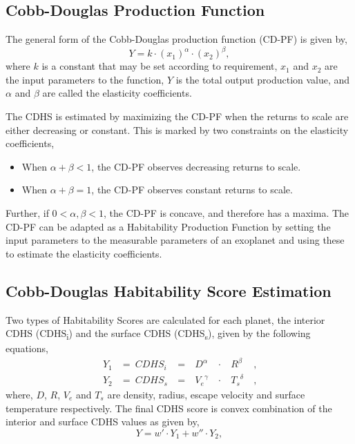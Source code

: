 \documentclass{article}
\begin{document}
\subsection{Cobb-Douglas Production Function}
The general form of the Cobb-Douglas production function (CD-PF) is given by,
\begin{equation}
  Y = k\cdot{(x_1)}^\alpha\cdot{(x_2)}^\beta,
\end{equation}
where $k$ is a constant that may be set according to requirement, $x_1$ and $x_2$ are the input parameters to the
function, $Y$ is the total output production value, and $\alpha$ and $\beta$ are called the elasticity coefficients.

The CDHS is estimated by maximizing the CD-PF when the returns to scale are either decreasing or constant. This is
marked by two constraints on the elasticity coefficients,
\begin{itemize}
\setlength\itemsep{0pt}
\item When $\alpha+\beta < 1$, the CD-PF observes decreasing returns to scale.
\item When $\alpha+\beta = 1$, the CD-PF observes constant returns to scale.
\end{itemize}
Further, if $0 < \alpha, \beta < 1$, the CD-PF is concave, and therefore has a maxima. The CD-PF can be adapted as a
Habitability Production Function by setting the input parameters to the measurable parameters of an exoplanet and using
these to estimate the elasticity coefficients.

\subsection{Cobb-Douglas Habitability Score Estimation}
Two types of Habitability Scores are calculated for each planet, the interior CDHS (CDHS\textsubscript{i}) and the
surface CDHS (CDHS\textsubscript{s}), given by the following equations,
\begin{subequations}
  \begin{alignat}{4}
    Y_1 &=\ {CDHS}_i\ &=\ &D^\alpha\ & \cdot\ &R^\beta\ &,\\
    Y_2 &=\ {CDHS}_s\ &=\ &{V_e}^\gamma\ & \cdot\ &{T_s}^\delta\ &,
  \end{alignat}
\end{subequations}
where, $D$, $R$, $V_e$ and $T_s$ are density, radius, escape velocity and surface temperature respectively. The final
CDHS score is convex combination of the interior and surface CDHS values as given by,
\begin{equation}
  Y = w'\cdot Y_1 + w''\cdot Y_2,
\end{equation}
\end{document}
